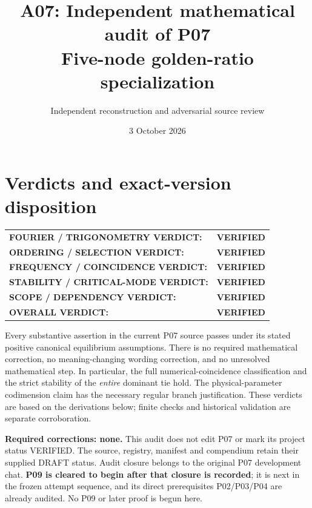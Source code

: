\documentclass[11pt]{article}
\title{A07: Independent mathematical audit of P07\\Five-node golden-ratio specialization}
\author{Independent reconstruction and adversarial source review}
\date{3 October 2026}
\begin{document}
\maketitle

\section{Verdicts and exact-version disposition}
\label{sec:verdict}
\begin{tabular}{@{}ll@{}}
\textbf{FOURIER / TRIGONOMETRY VERDICT:}&\textbf{VERIFIED}\\
\textbf{ORDERING / SELECTION VERDICT:}&\textbf{VERIFIED}\\
\textbf{FREQUENCY / COINCIDENCE VERDICT:}&\textbf{VERIFIED}\\
\textbf{STABILITY / CRITICAL-MODE VERDICT:}&\textbf{VERIFIED}\\
\textbf{SCOPE / DEPENDENCY VERDICT:}&\textbf{VERIFIED}\\
\textbf{OVERALL VERDICT:}&\textbf{VERIFIED}
\end{tabular}

Every substantive assertion in the current P07 source passes under its
stated positive canonical equilibrium assumptions. There is no required
mathematical correction, no meaning-changing wording correction, and no
unresolved mathematical step. In particular, the full numerical-coincidence
classification and the strict stability of the \emph{entire} dominant tie
hold. The physical-parameter codimension claim has the necessary regular
branch justification. These verdicts are based on the derivations below;
finite checks and historical validation are separate corroboration.

\textbf{Required corrections: none.} This audit does not edit P07 or mark
its project status VERIFIED. The source, registry, manifest and compendium
retain their supplied DRAFT status. Audit closure belongs to the original
P07 development chat. \textbf{P09 is cleared to begin after that closure
is recorded}; it is next in the frozen attempt sequence, and its direct
prerequisites P02/P03/P04 are already audited. No P09 or later proof is
begun here.
\end{document}

